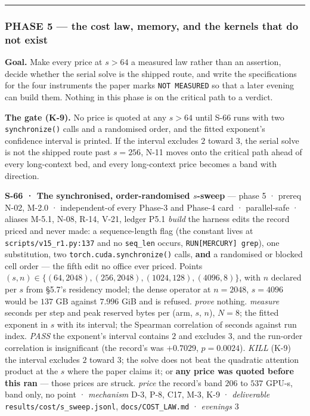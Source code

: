 \documentclass[11pt,a4paper]{article}
\theoremstyle{plain}
\theoremstyle{definition}
\theoremstyle{remark}
\begin{document}
\begin{center}\rule{0.5\linewidth}{0.5pt}\end{center}

\subsubsection{PHASE 5 --- the cost law, memory, and the kernels that do
not
exist}\label{phase-5-the-cost-law-memory-and-the-kernels-that-do-not-exist}

\textbf{Goal.} Make every price at \(s>64\) a measured law rather than
an assertion, decide whether the serial solve is the shipped route, and
write the specifications for the four instruments the paper marks
\texttt{NOT\ MEASURED} so that a later evening can build them. Nothing
in this phase is on the critical path to a verdict.

\textbf{The gate (K-9).} No price is quoted at any \(s>64\) until S-66
runs with two \texttt{synchronize()} calls and a randomised order, and
the fitted exponent's confidence interval is printed. If the interval
excludes \(2\) toward \(3\), the serial solve is not the shipped route
past \(s=256\), N-11 moves onto the critical path ahead of every
long-context bed, and every long-context price becomes a band with
direction.

\textbf{S-66 · The synchronised, order-randomised \(s\)-sweep} --- phase
5 · prereq N-02, M-2.0 · independent-of every Phase-3 and Phase-4 card ·
parallel-safe · aliases M-5.1, N-08, R-14, V-21, ledger P5.1
\emph{build} the harness edits the record priced and never made: a
sequence-length flag (the constant lives at
\texttt{scripts/v15\_r1.py:137} and no \texttt{seq\_len} occurs,
\texttt{RUN{[}MERCURY{]}\ grep}), one substitution, two
\texttt{torch.cuda.synchronize()} calls, \textbf{and} a randomised or
blocked cell order --- the fifth edit no office ever priced. Points
\((s,n)\in\{(64,2048),(256,2048),(1024,128),(4096,8)\}\), with \(n\)
declared per \(s\) from §5.7's residency model; the dense operator at
\(n=2048\), \(s=4096\) would be \(137\) GB against \(7.996\) GiB and is
refused. \emph{prove} nothing. \emph{measure} seconds per step and peak
reserved bytes per (arm, \(s\), \(n\)), \(N=8\); the fitted exponent in
\(s\) with its interval; the Spearman correlation of seconds against run
index. \emph{PASS} the exponent's interval contains \(2\) and excludes
\(3\), and the run-order correlation is insignificant (the record's was
\(+0.7029\), \(p=0.0024\)). \emph{KILL} (K-9) the interval excludes
\(2\) toward \(3\); the solve does not beat the quadratic attention
product at the \(s\) where the paper claims it; or \textbf{any price was
quoted before this ran} --- those prices are struck. \emph{price} the
record's band \(206\) to \(537\) GPU-s, band only, no point ·
\emph{mechanism} D-3, P-8, C17, M-3, K-9 · \emph{deliverable}
\texttt{results/cost/s\_sweep.jsonl}, \texttt{docs/COST\_LAW.md} ·
\emph{evenings} 3
\end{document}
